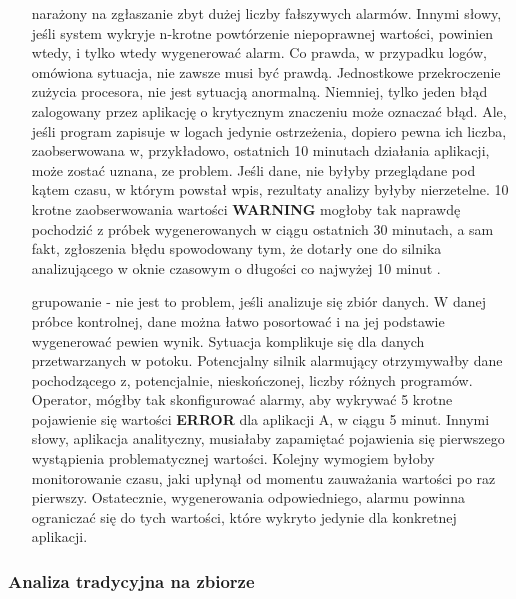 \begin{itemize}
        narażony na zgłaszanie zbyt dużej liczby fałszywych alarmów. Innymi słowy, jeśli system wykryje n-krotne powtórzenie 
        niepoprawnej wartości, powinien wtedy, i tylko wtedy wygenerować alarm. 
        Co prawda, w przypadku logów, omówiona sytuacja, nie zawsze musi być prawdą. Jednostkowe przekroczenie zużycia procesora, nie jest sytuacją anormalną.
        Niemniej, tylko jeden błąd zalogowany przez aplikację o krytycznym znaczeniu może oznaczać błąd. Ale, jeśli program zapisuje w logach jedynie ostrzeżenia,
        dopiero pewna ich liczba, zaobserwowana w, przykładowo, ostatnich 10 minutach działania aplikacji, może zostać uznana, ze problem. Jeśli dane, nie byłyby
        przeglądane pod kątem czasu, w którym powstał wpis, rezultaty analizy byłyby nierzetelne. 10 krotne zaobserwowania wartości \textbf{WARNING} mogłoby tak naprawdę
        pochodzić z próbek wygenerowanych w ciągu ostatnich 30 minutach, a sam fakt, zgłoszenia błędu spowodowany tym, że dotarły one do silnika analizującego
        w oknie czasowym o długości co najwyżej 10 minut \cite{8_requirements_of_real_time_processing}.
        \item[grupowanie] - nie jest to problem, jeśli analizuje się zbiór danych. W danej próbce kontrolnej, dane można łatwo posortować i na jej podstawie 
        wygenerować pewien wynik. Sytuacja komplikuje się dla danych przetwarzanych w potoku. Potencjalny silnik alarmujący otrzymywałby dane pochodzącego z,
        potencjalnie, nieskończonej, liczby różnych programów. Operator, mógłby tak skonfigurować alarmy, aby wykrywać 5 krotne pojawienie się wartości \textbf{ERROR}
        dla aplikacji A, w ciągu 5 minut. Innymi słowy, aplikacja analityczny, musiałaby zapamiętać pojawienia się pierwszego wystąpienia problematycznej wartości.
        Kolejny wymogiem byłoby monitorowanie czasu, jaki upłynął od momentu zauważania wartości po raz pierwszy. Ostatecznie, wygenerowania odpowiedniego,
        alarmu powinna ograniczać się do tych wartości, które wykryto jedynie dla konkretnej aplikacji.
    \end{itemize}
    
    \subsubsection{Analiza tradycyjna na zbiorze}
    \label{chapter:application_own:plans:alarm_on_logs:bulk}
    
